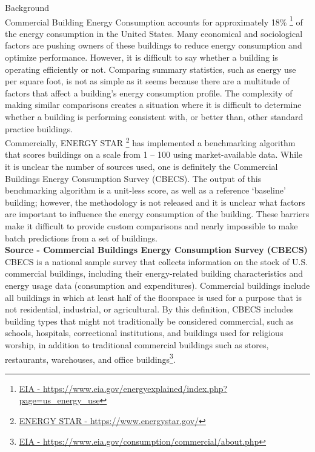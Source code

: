 {\Large {Background}}
\\
Commercial Building Energy Consumption accounts for approximately 18\% \footnote{\href{https://www.eia.gov/energyexplained/index.php?page=us_energy_use}{EIA - \url{https://www.eia.gov/energyexplained/index.php?page=us_energy_use}}} of the energy consumption in the United States.  Many economical and sociological factors are pushing owners of these buildings to reduce energy consumption and optimize performance.  However, it is difficult to say whether a building is operating efficiently or not.  Comparing summary statistics, such as energy use per square foot, is not as simple as it seems because there are a multitude of factors that affect a building’s energy consumption profile.  The complexity of making similar comparisons creates a situation where it is difficult to determine whether a building is performing consistent with, or better than, other standard practice buildings. 
\\
Commercially, ENERGY STAR \footnote{\href{https://www.energystar.gov/}{ENERGY STAR - \url{https://www.energystar.gov/}}} has implemented a benchmarking algorithm that scores buildings on a scale from 1 – 100 using market-available data.  While it is unclear the number of sources used, one is definitely the Commercial Buildings Energy Consumption Survey (CBECS).  The output of this benchmarking algorithm is a unit-less score, as well as a reference ‘baseline’ building; however, the methodology is not released and it is unclear what factors are important to influence the energy consumption of the building.  These barriers make it difficult to provide custom comparisons and nearly impossible to make batch predictions from a set of buildings.
\\[0.125in]
\textbf{Source - Commercial Buildings Energy Consumption Survey (CBECS)}
\\[0.0625in]
CBECS is a national sample survey that collects information on the stock of U.S. commercial buildings, including their energy-related building characteristics and energy usage data (consumption and expenditures). Commercial buildings include all buildings in which at least half of the floorspace is used for a purpose that is not residential, industrial, or agricultural. By this definition, CBECS includes building types that might not traditionally be considered commercial, such as schools, hospitals, correctional institutions, and buildings used for religious worship, in addition to traditional commercial buildings such as stores, restaurants, warehouses, and office buildings\footnote{\href{(https://www.eia.gov/consumption/commercial/about.php)}{EIA - \url{https://www.eia.gov/consumption/commercial/about.php}}}.